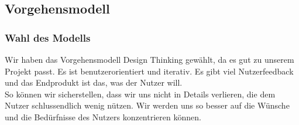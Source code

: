 \documentclass[10pt]{article}
\begin{document}
	\subsection{Vorgehensmodell}
		\subsubsection{Wahl des Modells}
		Wir haben das Vorgehensmodell Design Thinking gewählt, da es gut zu unserem Projekt passt. Es ist benutzerorientiert und iterativ. Es gibt viel Nutzerfeedback und das Endprodukt ist das, was der Nutzer will.\\
		So können wir sicherstellen, dass wir uns nicht in Details verlieren, die dem Nutzer schlussendlich wenig nützen. Wir werden uns so besser auf die Wünsche und die Bedürfnisse des Nutzers konzentrieren können.
\end{document}
